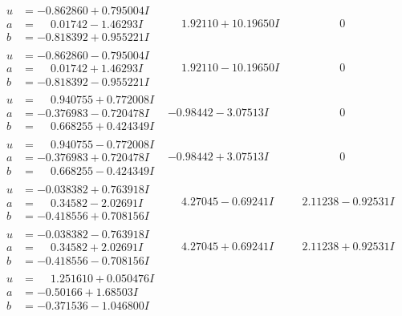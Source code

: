\documentclass[1p]{elsarticle_modified}
\theoremstyle{definition}
\begin{document}
$$\begin{array}{c|c|c}
\begin{aligned}
u &= -0.862860 + 0.795004 I \\
a &= \phantom{-}0.01742 - 1.46293 I \\
b &= -0.818392 + 0.955221 I\end{aligned}
 & \phantom{-}1.92110 + 10.19650 I & \phantom{-0.000000 } 0 \\ \hline\begin{aligned}
u &= -0.862860 - 0.795004 I \\
a &= \phantom{-}0.01742 + 1.46293 I \\
b &= -0.818392 - 0.955221 I\end{aligned}
 & \phantom{-}1.92110 - 10.19650 I & \phantom{-0.000000 } 0 \\ \hline\begin{aligned}
u &= \phantom{-}0.940755 + 0.772008 I \\
a &= -0.376983 - 0.720478 I \\
b &= \phantom{-}0.668255 + 0.424349 I\end{aligned}
 & -0.98442 - 3.07513 I & \phantom{-0.000000 } 0 \\ \hline\begin{aligned}
u &= \phantom{-}0.940755 - 0.772008 I \\
a &= -0.376983 + 0.720478 I \\
b &= \phantom{-}0.668255 - 0.424349 I\end{aligned}
 & -0.98442 + 3.07513 I & \phantom{-0.000000 } 0 \\ \hline\begin{aligned}
u &= -0.038382 + 0.763918 I \\
a &= \phantom{-}0.34582 - 2.02691 I \\
b &= -0.418556 + 0.708156 I\end{aligned}
 & \phantom{-}4.27045 - 0.69241 I & \phantom{-}2.11238 - 0.92531 I \\ \hline\begin{aligned}
u &= -0.038382 - 0.763918 I \\
a &= \phantom{-}0.34582 + 2.02691 I \\
b &= -0.418556 - 0.708156 I\end{aligned}
 & \phantom{-}4.27045 + 0.69241 I & \phantom{-}2.11238 + 0.92531 I \\ \hline\begin{aligned}
u &= \phantom{-}1.251610 + 0.050476 I \\
a &= -0.50166 + 1.68503 I \\
b &= -0.371536 - 1.046800 I\end{aligned}

\end{array}$$
\end{document}
